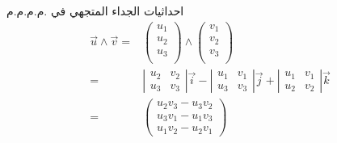 \begin{frame}%
\begin{block}{احداثيات الجداء المتجهي في .م.م.م.م}
	\begin{align*}
\displaystyle \vec{u}\wedge \vec{v}=& \begin{pmatrix}u_{1}\\u_{2}\\u_{3}\\
\end{pmatrix}\land   \begin{pmatrix}v_{1}\\v_{2}\\v_{3}\\	\end{pmatrix}\\
=&\left |\begin{array}{cc} u_{2}&v_{2}\\u_{3}&v_{3}\end{array}\right |\vec{i}- \left |\begin{array}{cc}u_{1}&v_{1}\\u_{3}&v_{3}\end{array}\right |\vec{j}+ \left |\begin{array}{cc}  u_{1}&v_{1} \\u_{2}&v_{2}\end{array}\right |\vec{k} \\
=&{\begin{pmatrix}u_{2}v_{3}-u_{3}v_{2}\\u_{3}v_{1}-u_{1}v_{3}\\u_{1}v_{2}-u_{2}v_{1}\end{pmatrix}}		
\end{align*}
\end{block}
\end{frame}

